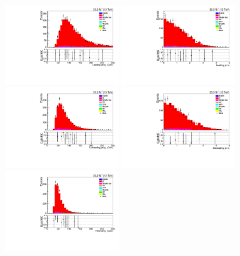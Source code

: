 \begin{figure}[ht]
\centering
\includegraphics[width=0.45\textwidth]{figs/background-estimation/plots/unblinded/ttbar_control/leadingJetPt_SingleTop_wMass_emu.pdf}
\includegraphics[width=0.45\textwidth]{figs/background-estimation/plots/unblinded/ttbar_control/leadingJetEta_SingleTop_wMass_emu.pdf}
\\
\includegraphics[width=0.45\textwidth]{figs/background-estimation/plots/unblinded/ttbar_control/secondJetPt_SingleTop_wMass_emu.pdf}
\includegraphics[width=0.45\textwidth]{figs/background-estimation/plots/unblinded/ttbar_control/secondJetEta_SingleTop_wMass_emu.pdf}
\\
\includegraphics[width=0.45\textwidth]{figs/background-estimation/plots/unblinded/ttbar_control/thirdJetPt_SingleTop_wMass_emu.pdf}

\end{figure}
